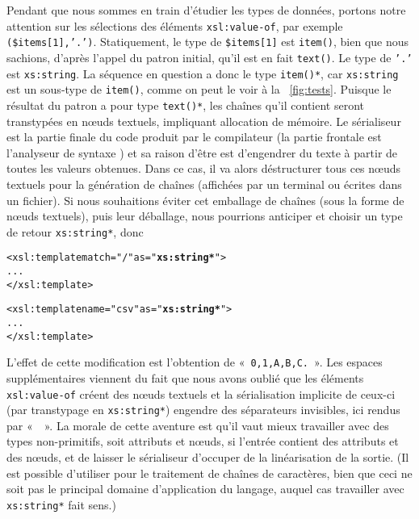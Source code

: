 Pendant que nous sommes en train d'étudier les types de données,
portons notre attention sur les sélections des éléments
\texttt{xsl:value-of}, par exemple
\texttt{(\$items[1],'.')}. Statiquement, le type de
\texttt{\$items[1]} est \texttt{item()}, bien que nous sachions,
d'après l'appel du patron initial, qu'il est en fait \texttt{text()}.
Le type de \texttt{'.'} est \texttt{xs:string}. La séquence en
question a donc le type \texttt{item()*}, car \texttt{xs:string} est
un sous-type de \texttt{item()}, comme on peut le voir à la
\fig~\vref{fig:tests}. Puisque le résultat du patron a pour type
\texttt{text()*}, les chaînes qu'il contient seront transtypées en
nœuds textuels, impliquant allocation de mémoire. Le sérialiseur
est la partie finale du code produit par le compilateur \XSLT (la
partie frontale est l'analyseur de syntaxe \XML) et sa raison d'être
est d'engendrer du texte à partir de toutes les valeurs obtenues. Dans
ce cas, il va alors déstructurer tous ces nœuds textuels pour la
génération de chaînes (affichées par un terminal ou écrites dans un
fichier). Si nous souhaitions éviter cet emballage de chaînes (sous
la forme de nœuds textuels), puis leur déballage, nous pourrions
anticiper et choisir un type de retour \texttt{xs:string*}, donc
\begin{alltt}
\small  <xsl:template match="/" as="\textbf{xs:string*}">
    ...
  </xsl:template>

  <xsl:template name="csv" as="\textbf{xs:string*}">
    ...
  </xsl:template>
\end{alltt}
L'effet de cette modification est l'obtention de
«~\texttt{0,\textvisiblespace{}1,\textvisiblespace{}A,\textvisiblespace{}B,\textvisiblespace{}C.}~». Les
espaces supplémentaires viennent du fait que nous avons oublié que les
éléments \texttt{xsl:value-of} créent des nœuds textuels et la
sérialisation implicite de ceux-ci (par transtypage en
\texttt{xs:string*}) engendre des séparateurs invisibles, ici rendus
par «~\texttt{\textvisiblespace}~». La morale de cette aventure est
qu'il vaut mieux travailler avec des types non-primitifs, soit
attributs et nœuds, si l'entrée contient des attributs et des
nœuds, et de laisser le sérialiseur d'occuper de la linéarisation
de la sortie. (Il est possible d'utiliser \XSLT pour le traitement de
chaînes de caractères, bien que ceci ne soit pas le principal domaine
d'application du langage, auquel cas travailler avec
\texttt{xs:string*} fait sens.)

